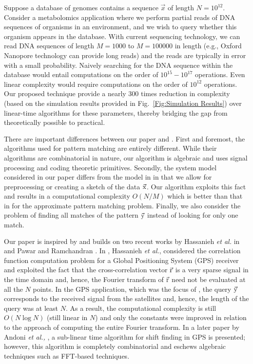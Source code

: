 	\begin{example}  Suppose a database of genomes contains a sequence $\vec{x}$ of length $N=10^{12}$. Consider a metabolomics application where we perform partial reads of DNA sequences of organisms in an environment, and we wish to query whether this organism appears in the database. With current sequencing technology, we can read DNA sequences of length $M=1000$ to $M = 100000$ in length (e.g., Oxford Nanopore technology can provide long reads) and the reads are typically in error with a small probability. Naively searching for the DNA sequence within the database would entail computations on the order of $10^{15}-10^{17}$ operations. Even linear complexity would require computations on the order of $10^{12}$ operations. Our proposed technique provide a nearly 300 times reduction in complexity (based on the simulation results provided in Fig.~\ref{Fig:Simulation Results}) over linear-time algorithms for these parameters, thereby bridging the gap from theoretically possible to practical.
	\end{example}
There are important differences between our paper and \cite{hassanieh2012faster,andoni2013shift,boyer1977fast,amir2004faster}. First and foremost, the algorithms used for pattern matching are entirely different. While their algorithms are combinatorial in nature, our algorithm is algebraic and uses signal processing and coding theoretic primitives. Secondly, the system model considered in our paper differs from the model in \cite{hassanieh2012faster,andoni2013shift,boyer1977fast,amir2004faster} in that we allow for preprocessing or creating a sketch of the data $\vec{\mathrm{x}}$. Our algorithm exploits this fact and results in a computational complexity $O(N/M)$ which is better than that in \cite{andoni2013shift} for the approximate pattern matching problem.  Finally, we also consider the problem of finding all matches of the pattern $\vec{\mathrm{y}}$ instead of looking for only one match.

Our paper is inspired by and builds on two recent works by Hassanieh {\em {et al.}} in \cite{hassanieh2012faster} and Pawar and Ramchandran \cite{pawar2014robust}. In \cite{hassanieh2012faster}, Hassanieh \emph{et al.}, considered the correlation function computation problem for a Global Positioning System (GPS) receiver and exploited the fact that the cross-correlation vector $\vec{\mathrm{r}}$ is a very sparse signal in the time domain and, hence, the Fourier transform of $\vec{\mathrm{r}}$ need not be evaluated at all the $N$ points. In the GPS application, which was the focus of \cite{hassanieh2012faster}, the query $\vec{\mathrm{y}}$ corresponds to the received signal from the satellites and, hence, the length of the query was at least $N$. As a result, the computational complexity is still $O(N \log N)$ (still linear in $N$) and only the constants were improved in relation to the approach of computing the entire Fourier transform. In a later paper by Andoni {\em et al.,} \cite{andoni2013shift}, a sub-linear time algorithm for shift finding in GPS is presented; however, this algorithm is completely combinatorial and eschews algebraic techniques such as FFT-based techniques.

